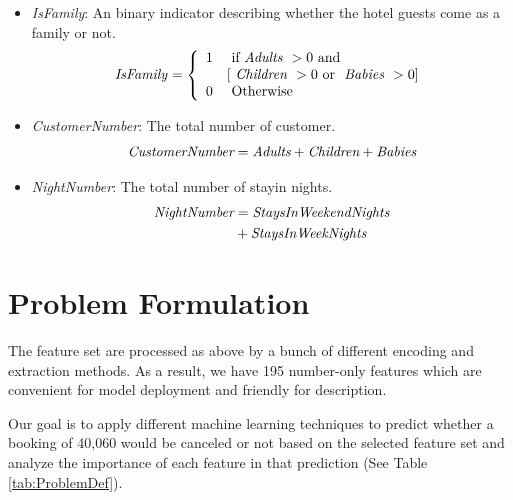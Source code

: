 \documentclass[10pt,twocolumn,letterpaper]{article}
\begin{document}
\begin{itemize}
    \item \emph{IsFamily}: An binary indicator describing whether the hotel guests come as a family or not. 
        \begin{align*}
            \text {\emph{IsFamily}}=\left\{\begin{array}{ll}
            1 & \text{ if \emph{Adults} }>0 \text{ and } \\
              & {[\text{ \emph{Children} }>0 \text{ or } \text{ \emph{Babies} }>0]} \\
            0 & \text{ Otherwise }
            \end{array}\right.
        \end{align*}
    \item \emph{CustomerNumber}: The total number of customer.
        \begin{equation*}
            \emph{CustomerNumber} = \emph{Adults} + \emph{Children} + \emph{Babies}
        \end{equation*}
    \item \emph{NightNumber}: The total number of stayin nights.
        \begin{equation*} \begin{split}
            \emph{NightNumber} &= \emph{StaysInWeekendNights} \\
                &+ \emph{StaysInWeekNights} 
        \end{split} \end{equation*}
\end{itemize}



\section{Problem Formulation}

The feature set are processed as above by a bunch of different encoding and extraction methods. As a result, we have 195 number-only features which are convenient for model deployment and friendly for description.

Our goal is to apply different machine learning techniques to predict whether a booking of 40,060 would be canceled or not based on the selected feature set and analyze the importance of each feature in that prediction (See Table \ref{tab:ProblemDef}).
\end{document}
